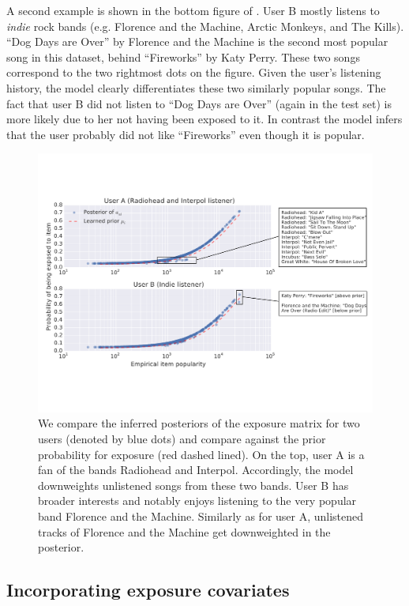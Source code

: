 A second example is shown in the bottom figure of . User B mostly
listens to \emph{indie} rock bands (e.g. Florence and the Machine, Arctic
Monkeys, and The Kills). ``Dog Days are Over'' by Florence and the Machine
is the second most popular song in this dataset, behind ``Fireworks'' by
Katy Perry. These two songs correspond to the two rightmost dots on the
figure. Given the user's listening history, the model clearly
differentiates these two similarly popular songs. The fact that user B did
not listen to ``Dog Days are Over'' (again in the test set) is more likely
due to her not having been exposed to it. In contrast the model infers
that the user probably did not like ``Fireworks'' even though it is
popular.

\begin{figure}[!tbp]
  \centering
   \includegraphics[width=\textwidth]{fig/rh_fl}
   \caption{We compare the inferred posteriors of the exposure matrix for two
  users (denoted by blue dots) and compare against the prior probability for exposure (red dashed lined). On the top, user A is a fan of the bands Radiohead and Interpol. 
  Accordingly, the model downweights unlistened songs from these two
  bands. User B has broader interests and notably enjoys listening to
  the very popular band Florence and the Machine. Similarly as for user A,
  unlistened tracks of Florence and the Machine get downweighted in the
   posterior.}
  \label{chpt:expomf:fig:expo_exp}
\end{figure}


\subsection{Incorporating exposure covariates}

